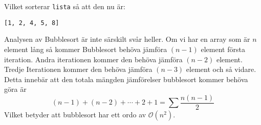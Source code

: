 \documentclass[a4, oneside]{report}
\begin{document}
Vilket sorterar \lstinline{lista} så att den nu är:
\begin{lstlisting}[style=mystyle, numbers=none]
 [1, 2, 4, 5, 8]
\end{lstlisting} 
Analysen av  Bubblesort är inte särskilt svår heller. Om vi har en array som är $n$ element lång så kommer Bubblesort behöva jämföra $(n-1)$ element första iteration. Andra iterationen kommer den behöva jämföra $(n-2)$ element. Tredje Iterationen kommer den behöva jämföra $(n-3)$ element och så vidare. Detta innebär att den totala mängden jämförelser  bubblesort kommer behöva göra är
\begin{equation*}
    (n-1) + (n-2) + \cdots + 2 + 1 = \sum\frac{n(n-1)}{2}
\end{equation*}
Vilket betyder att bubblesort har ett ordo av $\mathcal{O}(n^2)$.\\
\end{document}
